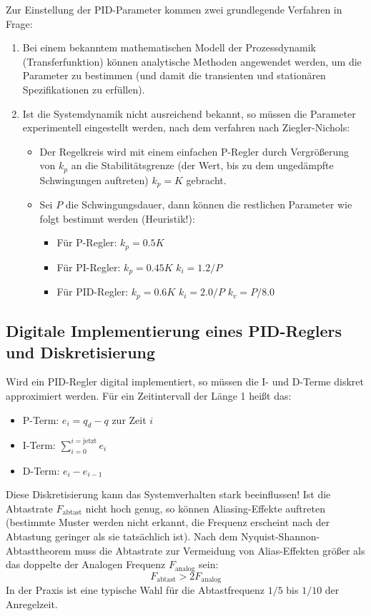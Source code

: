 				Zur Einstellung der PID-Parameter kommen zwei grundlegende Verfahren in Frage:
				\begin{enumerate}
					\item Bei einem bekanntem mathematischen Modell der Prozessdynamik (Transferfunktion) können analytische Methoden angewendet werden, um die Parameter zu bestimmen (und damit die transienten und stationären Spezifikationen zu erfüllen).
					\item Ist die Systemdynamik nicht ausreichend bekannt, so müssen die Parameter experimentell eingestellt werden, \zB nach dem verfahren nach Ziegler-Nichols:
						\begin{itemize}
							\item Der Regelkreis wird mit einem einfachen P-Regler durch Vergrößerung von \(k_p\) an die Stabilitätsgrenze (der Wert, bis zu dem ungedämpfte Schwingungen auftreten) \( k_p = K \) gebracht.
							\item Sei \(P\) die Schwingungsdauer, dann können die restlichen Parameter wie folgt bestimmt werden (Heuristik!):
								\begin{itemize}
									\item Für P-Regler:   \tabto{3cm} \( k_p = 0.5K \)
									\item Für PI-Regler:  \tabto{3cm} \( k_p = 0.45K \) \tabto{5.5cm} \( k_i = 1.2 / P \)
									\item Für PID-Regler: \tabto{3cm} \( k_p = 0.6K \)  \tabto{5.5cm} \( k_i = 2.0 / P \) \tabto{8cm} \( k_v = P / 8.0 \)
								\end{itemize}
						\end{itemize}
				\end{enumerate}

		\subsection{Digitale Implementierung eines PID-Reglers und Diskretisierung}
			Wird ein PID-Regler digital implementiert, so müssen die I- und D-Terme diskret approximiert werden. Für ein Zeitintervall der Länge \num{1} heißt das:
			\begin{itemize}
				\item P-Term: \tabto{2cm} \( e_i = q_d - q \) zur Zeit \(i\)
				\item I-Term: \tabto{2cm} \( \sum_{i = 0}^{i = \text{jetzt}} e_i \)
				\item D-Term: \tabto{2cm} \( e_i - e_{i - 1} \)
			\end{itemize}
			Diese Diskretisierung kann das Systemverhalten stark beeinflussen! Ist die Abtastrate \( F_\text{abtast} \) nicht hoch genug, so können Aliasing-Effekte auftreten (\dh bestimmte Muster werden nicht erkannt, die Frequenz erscheint nach der Abtastung geringer als sie tatsächlich ist). Nach dem Nyquist-Shannon-Abtasttheorem muss die Abtastrate zur Vermeidung von Alias-Effekten größer als das doppelte der Analogen Frequenz \( F_\text{analog} \) sein:
			\begin{equation*}
				F_\text{abtast} > 2 F_\text{analog}
			\end{equation*}
			In der Praxis ist eine typische Wahl für die Abtastfrequenz \( 1/5 \) bis \( 1/10 \) der Anregelzeit.

